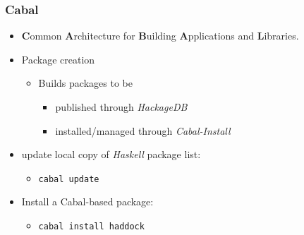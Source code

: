 \begin{frame}
  \frametitle{Cabal}
  \begin{itemize}
    \item {\bf C}ommon {\bf A}rchitecture for {\bf B}uilding {\bf A}pplications and {\bf L}ibraries.
    \item Package creation
      \begin{itemize}
        \item Builds packages to be 
          \begin{itemize}
            \item published through \emph{HackageDB}
            \item installed/managed through \emph{Cabal-Install}
          \end{itemize}
      \end{itemize}    
    \item update local copy of \emph{Haskell} package list:
      \begin{itemize}
        \item \texttt{cabal update}
      \end{itemize}    
    \item Install a Cabal-based package:
      \begin{itemize}
        \item \texttt{cabal install haddock}
      \end{itemize}    
  \end{itemize}     
\end{frame}
